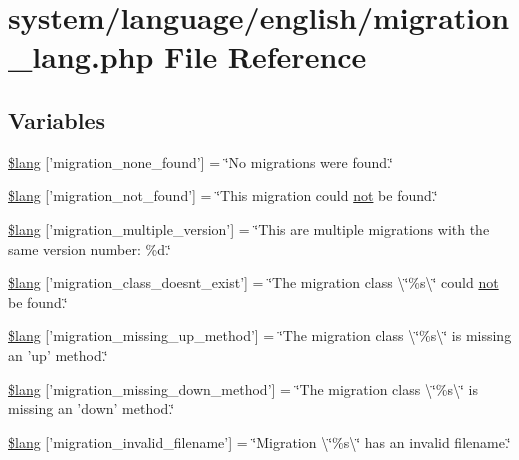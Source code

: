\hypertarget{migration__lang_8php}{\section{system/language/english/migration\-\_\-lang.php File Reference}
\label{migration__lang_8php}
}
\subsection*{Variables}
\begin{DoxyCompactItemize}
\item 
\hyperlink{migration__lang_8php_affa6337f0973de810b3c61491deae6b1}{\$lang} \mbox{[}'migration\-\_\-none\-\_\-found'\mbox{]} = \char`\"{}No migrations were found.\char`\"{}
\item 
\hyperlink{migration__lang_8php_a92dd777422d70950993d43f4d0c31b1b}{\$lang} \mbox{[}'migration\-\_\-not\-\_\-found'\mbox{]} = \char`\"{}This migration could \hyperlink{mathquill_8js_ac1e1ab538c27d68cc2cbafea74e7412c}{not} be found.\char`\"{}
\item 
\hyperlink{migration__lang_8php_a1a98130d04f280e6a5f6f509179f9e01}{\$lang} \mbox{[}'migration\-\_\-multiple\-\_\-version'\mbox{]} = \char`\"{}This are multiple migrations with the same version number\-: \%d.\char`\"{}
\item 
\hyperlink{migration__lang_8php_a141dceda5b8294f6e4ddf7e5da6fe71d}{\$lang} \mbox{[}'migration\-\_\-class\-\_\-doesnt\-\_\-exist'\mbox{]} = \char`\"{}The migration class \textbackslash{}\char`\"{}\%s\textbackslash{}\char`\"{} could \hyperlink{mathquill_8js_ac1e1ab538c27d68cc2cbafea74e7412c}{not} be found.\char`\"{}
\item 
\hyperlink{migration__lang_8php_a4bc9c60a4f078d1845d1d72370c363e8}{\$lang} \mbox{[}'migration\-\_\-missing\-\_\-up\-\_\-method'\mbox{]} = \char`\"{}The migration class \textbackslash{}\char`\"{}\%s\textbackslash{}\char`\"{} is missing an 'up' method.\char`\"{}
\item 
\hyperlink{migration__lang_8php_a6e835ce0b327b8ea1df42bfc7a59f1cd}{\$lang} \mbox{[}'migration\-\_\-missing\-\_\-down\-\_\-method'\mbox{]} = \char`\"{}The migration class \textbackslash{}\char`\"{}\%s\textbackslash{}\char`\"{} is missing an 'down' method.\char`\"{}
\item 
\hyperlink{migration__lang_8php_a75ef7572f25674e4dd1e36a0d61080fa}{\$lang} \mbox{[}'migration\-\_\-invalid\-\_\-filename'\mbox{]} = \char`\"{}Migration \textbackslash{}\char`\"{}\%s\textbackslash{}\char`\"{} has an invalid filename.\char`\"{}
\end{DoxyCompactItemize}



